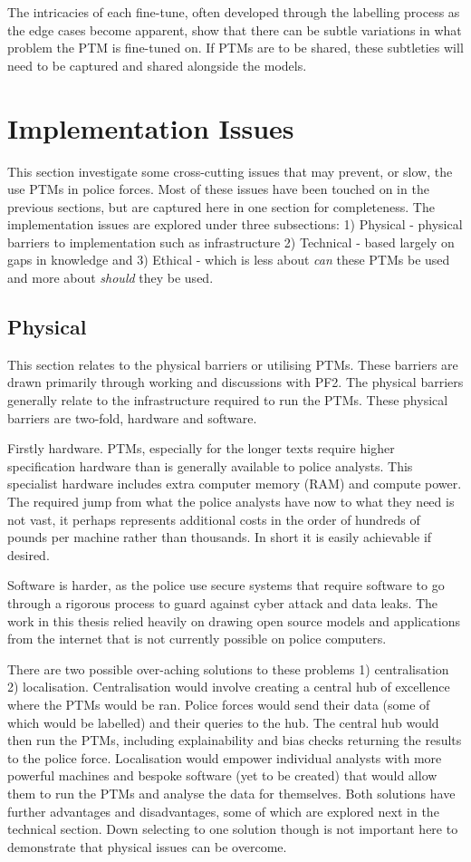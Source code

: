 The intricacies of each fine-tune, often developed through the labelling process as the edge cases become apparent, show that there can be subtle variations in what problem the PTM is fine-tuned on. If PTMs are to be shared, these subtleties will need to be captured and shared alongside the models.

\section{Implementation Issues} This section investigate some cross-cutting issues that may prevent, or slow, the use PTMs in police forces. Most of these issues have been touched on in the previous sections, but are captured here in one section for completeness. The implementation issues are explored under three subsections: 1) Physical - physical barriers to implementation such as infrastructure 2) Technical - based largely on gaps in knowledge and 3) Ethical - which is less about \emph{can} these PTMs be used and more about \emph{should} they be used.

\subsection{Physical} This section relates to the physical barriers or utilising PTMs. These barriers are drawn primarily through working and discussions with PF2. The physical barriers generally relate to the infrastructure required to run the PTMs. These physical barriers are two-fold, hardware and software. 

Firstly hardware. PTMs, especially for the longer texts require higher specification hardware than is generally available to police analysts. This specialist hardware includes extra computer memory (RAM) and compute power. The required jump from what the police analysts have now to what they need is not vast, it perhaps represents additional costs in the order of hundreds of pounds per machine rather than thousands. In short it is easily achievable if desired.  

Software is harder, as the police use secure systems that require software to go through a rigorous process to guard against cyber attack and data leaks. The work in this thesis relied heavily on drawing open source models and applications from the internet that is not currently possible on police computers. 

There are two possible over-aching solutions to these problems 1) centralisation 2) localisation. Centralisation would involve creating a central hub of excellence where the PTMs would be ran. Police forces would send their data (some of which would be labelled) and their queries to the hub. The central hub would then run the PTMs, including explainability and bias checks returning the results to the police force. Localisation would empower individual analysts with more powerful machines and bespoke software (yet to be created) that would allow them to run the PTMs and analyse the data for themselves. Both solutions have further advantages and disadvantages, some of which are explored next in the technical section. Down selecting to one solution though is not important here to demonstrate that physical issues can be overcome.    

